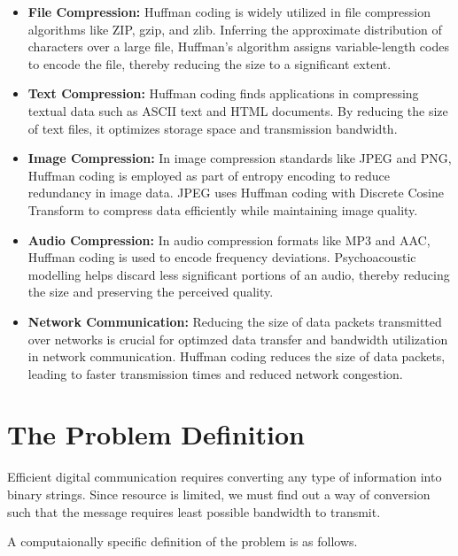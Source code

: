 \documentclass[18pt]{article}
\begin{document}
\begin{itemize}
	\item \textbf{File Compression:} Huffman coding is widely utilized in file compression algorithms like ZIP, gzip, and zlib. Inferring the approximate distribution of characters over a large file, Huffman's algorithm assigns variable-length codes to encode the file, thereby reducing the size to a significant extent. 
	
	\item \textbf{Text Compression:}  Huffman coding finds applications in compressing textual data such as ASCII text and HTML documents. By reducing the size of text files, it optimizes storage space and transmission bandwidth. 
	
	\item \textbf{Image Compression:} In image compression standards like JPEG and PNG, Huffman coding is employed as part of entropy encoding to reduce redundancy in image data. 
	JPEG uses Huffman coding with Discrete Cosine Transform to compress data efficiently while maintaining image quality.
	
	\item \textbf{Audio Compression:} In audio compression formats like MP3 and AAC, Huffman coding is used to encode frequency deviations. Psychoacoustic modelling helps discard less significant portions of an audio, thereby reducing the size and preserving the perceived quality.
	
	
	\item \textbf{Network Communication:} Reducing the size of data packets transmitted over networks is crucial for optimzed data transfer and bandwidth utilization in network communication. Huffman coding reduces the size of data packets, leading to faster transmission times and reduced network congestion.
	
	
\end{itemize}

\newpage

\section{The Problem Definition}

Efficient digital communication requires converting any type of
information into binary strings. Since resource is limited, we must find
out a way of conversion such that the message requires least possible
bandwidth to transmit.

A computaionally specific definition of the problem is as follows.
\end{document}
